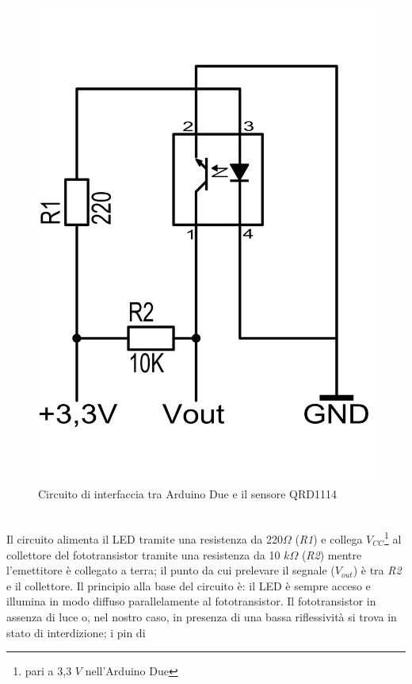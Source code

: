 \begin{figure}[!htb] \center
\includegraphics[scale=0.3]{immagini/QRD1114_Circuito.png}
\caption{Circuito di interfaccia tra Arduino Due e il sensore QRD1114} 
\end{figure}
\\Il circuito alimenta il LED tramite una resistenza da 220$\Omega$ (\textit{R1}) 
e collega $V_{CC}$\footnote{pari a 3,3 $V$ nell'Arduino Due} al collettore del 
fototransistor tramite una resistenza da 10 $k\Omega$ (\textit{R2}) mentre 
l'emettitore è collegato a terra; il punto da cui prelevare il segnale ($V_{out
}$) è tra \textit{R2} e il collettore. Il principio alla base del circuito è: 
il LED è sempre acceso e illumina in modo diffuso parallelamente al 
fototransistor. Il fototransistor in assenza di luce o, nel nostro caso, in 
presenza di una bassa riflessività si trova in stato di interdizione; i pin di 
